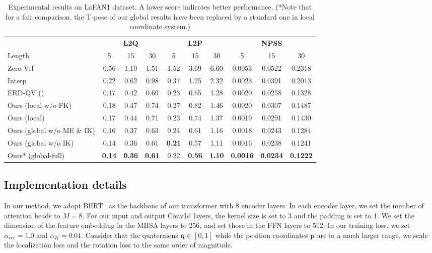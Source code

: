 \documentclass[10pt,twocolumn,letterpaper]{article}
\begin{document}
\begin{table*}[ht]
\centering
\caption{Experimental results on LaFAN1 dataset. A lower score indicates better performance. (*Note that for a fair comparison, the T-pose of our global results have been replaced by a standard one in local coordinate system.)}
\begin{tabularx}{\textwidth}{l@{\extracolsep{\fill}} ccccccccc}
&\multicolumn{3}{c}{\textbf{L2Q}} &\multicolumn{3}{c}{\textbf{L2P}} &\multicolumn{3}{c}{\textbf{NPSS}} \\
\cmidrule(lr){2-4}\cmidrule(lr){5-7}\cmidrule(lr){8-10}
Length & 5 & 15 & 30 & 5 & 15 & 30 & 5 & 15 & 30\\
\cmidrule(lr){1-10}
Zero-Vel & 0.56 & 1.10 & 1.51 & 1.52 & 3.69 & 6.60 & 0.0053 & 0.0522 & 0.2318 \\
Interp & 0.22 & 0.62 & 0.98 & 0.37 & 1.25 & 2.32 & 0.0023 & 0.0391 & 0.2013 \\
\cmidrule(lr){1-10}
ERD-QV (\cite{harvey2020robust}) & 0.17 & 0.42 & 0.69 & 0.23 & 0.65 & 1.28 & 0.0020 & 0.0258 & 0.1328 \\
Ours (local w/o FK) & 0.18 & 0.47 & 0.74 & 0.27 & 0.82 & 1.46 & 0.0020 & 0.0307 & 0.1487\\
Ours (local)  & 0.17 & 0.44 & 0.71 & 0.23 & 0.74 & 1.37 & 0.0019 & 0.0291 & 0.1430\\
Ours (global w/o ME \& IK) & 0.16 & 0.37 & 0.63 & 0.24 & 0.61 & 1.16 & 0.0018 & 0.0243 & 0.1284\\
Ours (global w/o IK)  & 0.14 & 0.36 & 0.61 & \bf{0.21} & 0.57 & 1.11 & 0.0016 & 0.0238 & 0.1241\\
Ours* (global-full)  & \bf{0.14} & \bf{0.36} & \bf{0.61} & 0.22 & \bf{0.56} & \bf{1.10} & \bf{0.0016} & \bf{0.0234} & \bf{0.1222} \\
\bottomrule
\end{tabularx}\label{tab:inbetweening}
\end{table*}


\subsection{Implementation details}

In our method, we adopt BERT~\cite{devlin2018bert} as the backbone of our transformer with 8 encoder layers. In each encoder layer, we set the number of attention heads to $M=8$. For our input and output Conv1d layers, the kernel size is set to 3 and the padding is set to 1. We set the dimension of the feature embedding in the MHSA layers to 256, and set those in the FFN layers to 512. In our training loss, we set $\alpha_{rec} = 1.0$ and $\alpha_{K} = 0.01$. Consider that the quaternions $\bm{q} \in [0, 1]$ while the position coordinates $\bm{p}$ are in a much larger range, we scale the localization loss and the rotation loss to the same order of magnitude.
\end{document}
